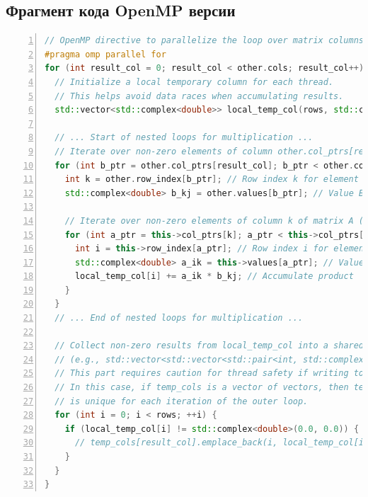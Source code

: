 \documentclass[12pt]{article}
\begin{document}
\subsection*{Фрагмент кода OpenMP версии}
\begin{lstlisting}[language=C++, numbers=left, caption="Основной цикл\, распараллеленный с помощью OpenMP", label=lst:openmp_example]
// OpenMP directive to parallelize the loop over matrix columns
#pragma omp parallel for
for (int result_col = 0; result_col < other.cols; result_col++) {
  // Initialize a local temporary column for each thread.
  // This helps avoid data races when accumulating results.
  std::vector<std::complex<double>> local_temp_col(rows, std::complex<double>(0.0, 0.0));

  // ... Start of nested loops for multiplication ...
  // Iterate over non-zero elements of column other.col_ptrs[result_col] ... other.col_ptrs[result_col + 1] - 1 of matrix B (other)
  for (int b_ptr = other.col_ptrs[result_col]; b_ptr < other.col_ptrs[result_col + 1]; ++b_ptr) {
    int k = other.row_index[b_ptr]; // Row index k for element B_kj
    std::complex<double> b_kj = other.values[b_ptr]; // Value B_kj

    // Iterate over non-zero elements of column k of matrix A (this)
    for (int a_ptr = this->col_ptrs[k]; a_ptr < this->col_ptrs[k + 1]; ++a_ptr) {
      int i = this->row_index[a_ptr]; // Row index i for element A_ik
      std::complex<double> a_ik = this->values[a_ptr]; // Value A_ik
      local_temp_col[i] += a_ik * b_kj; // Accumulate product
    }
  }
  // ... End of nested loops for multiplication ...

  // Collect non-zero results from local_temp_col into a shared structure
  // (e.g., std::vector<std::vector<std::pair<int, std::complex<double>>>> temp_cols)
  // This part requires caution for thread safety if writing to a shared data structure.
  // In this case, if temp_cols is a vector of vectors, then temp_cols[result_col]
  // is unique for each iteration of the outer loop.
  for (int i = 0; i < rows; ++i) {
    if (local_temp_col[i] != std::complex<double>(0.0, 0.0)) {
      // temp_cols[result_col].emplace_back(i, local_temp_col[i]); // Example
    }
  }
}
\end{lstlisting}
\end{document}
